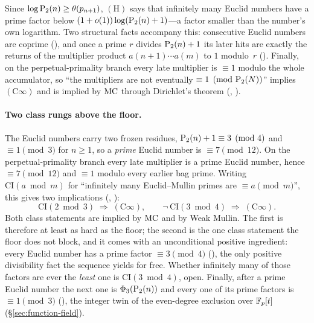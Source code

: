 Since $\log \mathrm{P}_{2}(n) \geq \theta(p_{n+1})$, $(\mathrm{H})$ says that
infinitely many Euclid numbers have a prime factor below
$(1+o(1))\log(\mathrm{P}_{2}(n)+1)$---a factor smaller than the number's own
logarithm.  Two structural facts accompany this: consecutive Euclid numbers are coprime
(), and once a
prime $r$ divides $\mathrm{P}_{2}(n)+1$ its later hits are exactly the returns of
the multiplier product $a(n{+}1)\cdots a(m)$ to $1$ modulo~$r$
().
Finally, on the perpetual-primality branch every late multiplier is
$\equiv 1$ modulo the whole accumulator, so ``the multipliers are not
eventually $\equiv 1 \pmod{\mathrm{P}_{2}(N)}$'' implies $(\mathrm{C}\infty)$
and is implied by $\mathrm{MC}$ through Dirichlet's theorem
(,
).

\paragraph{Two class rungs above the floor.}
The Euclid numbers carry two frozen residues, $\mathrm{P}_{2}(n)+1 \equiv 3
\pmod 4$ and $\equiv 1 \pmod 3$ for $n \geq 1$, so a \emph{prime} Euclid
number is $\equiv 7 \pmod{12}$.  On the perpetual-primality branch every
late multiplier is a prime Euclid number, hence $\equiv 7 \pmod{12}$ and
$\equiv 1$ modulo every earlier bag prime.  Writing $\mathrm{CI}(a \bmod m)$
for ``infinitely many Euclid--Mullin primes are $\equiv a \pmod m$'', this
gives two implications
(,
):
\[
  \mathrm{CI}(2 \bmod 3) \;\Longrightarrow\; (\mathrm{C}\infty),
  \qquad
  \neg\,\mathrm{CI}(3 \bmod 4) \;\Longrightarrow\; (\mathrm{C}\infty).
\]
Both class statements are implied by $\mathrm{MC}$ and by Weak Mullin.  The first
is therefore at least as hard as the floor; the second is the one class
statement the floor does not block, and it comes with an unconditional
positive ingredient: every Euclid number has a prime factor $\equiv 3
\pmod 4$
(),
the only positive divisibility fact the sequence yields for free.  Whether
infinitely many of those factors are ever the \emph{least} one is
$\mathrm{CI}(3 \bmod 4)$, open.  Finally, after a prime Euclid number the
next one is $\Phi_3(\mathrm{P}_{2}(n))$ and every one of its prime factors is
$\equiv 1 \pmod 3$
(),
the integer twin of the even-degree exclusion over $\mathbb{F}_p[t]$
(\S\ref{sec:function-field}).


